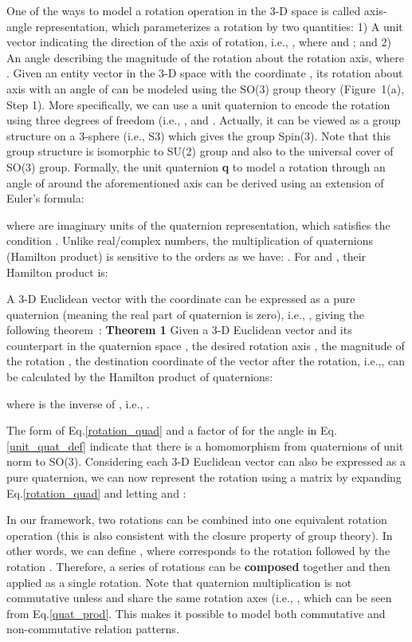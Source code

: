 \documentclass[11pt]{article}
\begin{document}
One of the ways to model a rotation operation in the 3-D space is called axis-angle representation, which parameterizes a rotation by two quantities: 1) A unit vector  indicating the direction of the axis of rotation, i.e.,  , where  and ; and  2) An angle  describing the magnitude of the rotation about the rotation axis, where . Given an entity vector  in the 3-D space with the coordinate , its rotation about axis  with an angle of  can be modeled using the SO(3) group theory (Figure~1(a), Step 1). More specifically, we can use a unit quaternion to encode the rotation using three degrees of freedom (i.e., ,  and . Actually, it can be viewed as a group structure on a 3-sphere (i.e., S3) which gives the group Spin(3). Note that this group structure is isomorphic to SU(2) group and also to the universal cover of SO(3) group. Formally, the unit quaternion \textbf{q} to model a rotation through an angle of  around the aforementioned axis  can be derived using an extension of Euler's formula:

\noindent where  are imaginary units of the quaternion representation, which satisfies the condition .
Unlike real/complex numbers, the multiplication of quaternions (Hamilton product) is sensitive to the orders as we have: .
For  and , their Hamilton product is:


A 3-D Euclidean vector  with the coordinate  can be expressed as a pure quaternion (meaning the real part of quaternion is zero), i.e., , giving the following theorem~\cite{jia2019quaternions}:
\textbf{Theorem 1} Given a 3-D Euclidean vector   and its counterpart in the quaternion space , the desired rotation axis , the magnitude of the rotation , the destination coordinate of the vector after the rotation, i.e.,, can be calculated by the Hamilton product of quaternions:

\noindent where  is the inverse of , i.e., .

The form of Eq.\ref{rotation_quad} and a factor of  for the angle  in Eq.\ref{unit_quat_def} indicate that there is a  homomorphism from quaternions of unit norm to SO(3). Considering each 3-D Euclidean vector can also be expressed as a pure quaternion, we can now represent the rotation using a matrix  by expanding Eq.\ref{rotation_quad} and letting  and :
\begin{scriptsize}

\end{scriptsize}

In our framework, two rotations can be combined into one equivalent rotation operation (this is also consistent with the closure property of group theory). In other words, we can define , where  corresponds to the rotation  followed by the rotation . Therefore, a series of rotations can be \textbf{composed} together and then applied as a single rotation. Note that quaternion multiplication is not commutative unless  and  share the same rotation axes (i.e., , which can be seen from Eq.\ref{quat_prod}. This makes it possible to model both commutative and non-commutative relation patterns. 
\end{document}
